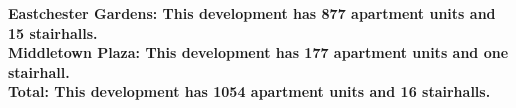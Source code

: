 \bf{Eastchester Gardens}: This development has 877 apartment units and 15 stairhalls.\\\bf{Middletown Plaza}: This development has 177 apartment units and one stairhall.\\\bf{Total}: This development has 1054 apartment units and 16 stairhalls.\\